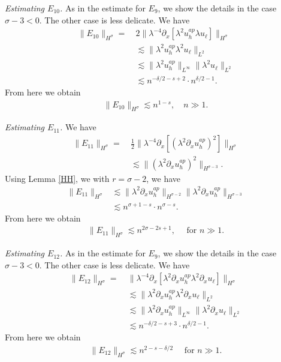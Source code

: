 \documentclass[reqno]{amsart}
\theoremstyle{plain}
\numberwithin{equation}{section}
\begin{document}
  
   {\em Estimating $E_{10}$.}
As in the estimate for $E_9$, we show the details in the case $\sigma - 3<0$. The other case is less delicate. We have 
    \begin{align*}
 \| E_{10}\|_{H^\sigma}  
 = \ & 2  \|   \lambda^{-4}  \partial_x \left [  \lambda^2 u_h ^{ap}   \lambda u_\ell    \right ]     \|_{H^\sigma} 
 \\ &  \lesssim 
  \|  \lambda^2 u_h ^{ap}   \lambda^2 u_\ell        \|_{ L^2} 
 \\ &  \lesssim 
  \|     \lambda ^2u_h ^{ap}         \|_{ L^\infty}   \|     \lambda ^2u_\ell         \|_{ L^2} 
 \\ &  \lesssim 
 n^{-\delta/2-s+2} \cdot n^{ \delta/2-1} .
 \end{align*}
 From here we obtain 
     \begin{align*}
 \| E_{10} \|_{H^\sigma}  \lesssim n^{1-s }  , \quad n\gg 1 .
 \end{align*}
 
  
  
   {\em Estimating $E_{11}$.}
  We have 
    \begin{align*}
 \| E_{11}\|_{H^\sigma}  
 = \ & \frac12  \|   \lambda^{-4}  \partial_x \left [ \left( \lambda^2  \partial_x u_h ^{ap}  \right)^2    \right ]     \|_{H^\sigma} 
 \\ &  \lesssim 
  \|   \left( \lambda^2  \partial_x u_h ^{ap}  \right)^2        \|_{ H^{\sigma-3} }  .
  \end{align*}
  Using Lemma \ref{HH}, we with $r = \sigma-2$, we have 
    \begin{align*}
 \| E_{11}\|_{H^\sigma}  
 &  \lesssim 
  \|     \lambda ^2 \partial_x u_h ^{ap}        \|_{ H^{\sigma-2} }   \|     \lambda ^2 \partial_x u_h ^{ap}         \|_{ H^{\sigma-3} } 
 \\ &  \lesssim 
 n^{\sigma+1-s} \cdot n^{ \sigma-s} .
 \end{align*}
 From here we obtain 
     \begin{align*}
 \| E_{11} \|_{H^\sigma}  \lesssim n^{2\sigma-2s+1 }   , \quad \text{ for } n\gg 1.
 \end{align*}
 
   
  
   {\em Estimating $E_{12}$.}
As in the estimate for $E_9$, we show the details in the case $\sigma - 3<0$. The other case is less delicate. We have 
    \begin{align*}
 \| E_{12}\|_{H^\sigma}  
 = \ & \|   \lambda^{-4}  \partial_x \left [  \lambda ^2 \partial_x u_h ^{ap}    \lambda ^2 \partial_x u_\ell   \right ]     \|_{H^\sigma} 
  \\ &  \lesssim 
  \|   \lambda ^2 \partial_x u_h ^{ap}    \lambda ^2 \partial_x u_\ell       \|_{ L^2} 
 \\ &  \lesssim 
  \|     \lambda ^2\partial_x  u_h ^{ap}         \|_{ L^\infty}   \|     \lambda ^2\partial_x  u_\ell         \|_{ L^2} 
 \\ &  \lesssim 
 n^{-\delta/2-s+3} \cdot n^{ \delta/2-1} .
 \end{align*}
 From here we obtain 
     \begin{align*}
 \| E_{12} \|_{H^\sigma}  \lesssim n^{2-s-\delta/2 } \quad \text{ for } n\gg 1 .
 \end{align*}
 
\end{document}
